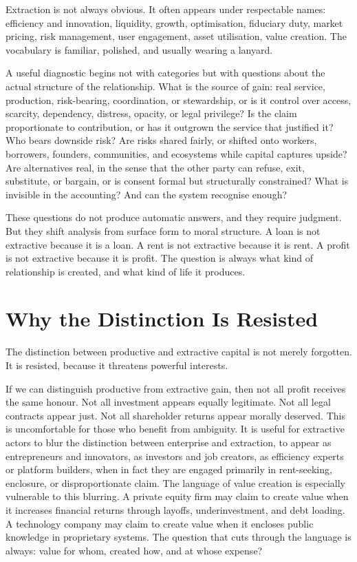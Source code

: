 \documentclass[11pt,a4paper,oneside]{book}
\begin{document}
Extraction is not always obvious. It often appears under respectable names: efficiency and innovation, liquidity, growth, optimisation, fiduciary duty, market pricing, risk management, user engagement, asset utilisation, value creation. The vocabulary is familiar, polished, and usually wearing a lanyard.

A useful diagnostic begins not with categories but with questions about the actual structure of the relationship. What is the source of gain: real service, production, risk-bearing, coordination, or stewardship, or is it control over access, scarcity, dependency, distress, opacity, or legal privilege? Is the claim proportionate to contribution, or has it outgrown the service that justified it? Who bears downside risk? Are risks shared fairly, or shifted onto workers, borrowers, founders, communities, and ecosystems while capital captures upside? Are alternatives real, in the sense that the other party can refuse, exit, substitute, or bargain, or is consent formal but structurally constrained? What is invisible in the accounting? And can the system recognise enough?

These questions do not produce automatic answers, and they require judgment. But they shift analysis from surface form to moral structure. A loan is not extractive because it is a loan. A rent is not extractive because it is rent. A profit is not extractive because it is profit. The question is always what kind of relationship is created, and what kind of life it produces.

\section*{Why the Distinction Is Resisted}

The distinction between productive and extractive capital is not merely forgotten. It is resisted, because it threatens powerful interests.

If we can distinguish productive from extractive gain, then not all profit receives the same honour. Not all investment appears equally legitimate. Not all legal contracts appear just. Not all shareholder returns appear morally deserved. This is uncomfortable for those who benefit from ambiguity. It is useful for extractive actors to blur the distinction between enterprise and extraction, to appear as entrepreneurs and innovators, as investors and job creators, as efficiency experts or platform builders, when in fact they are engaged primarily in rent-seeking, enclosure, or disproportionate claim. The language of value creation is especially vulnerable to this blurring. A private equity firm may claim to create value when it increases financial returns through layoffs, underinvestment, and debt loading. A technology company may claim to create value when it encloses public knowledge in proprietary systems. The question that cuts through the language is always: value for whom, created how, and at whose expense?
\end{document}
